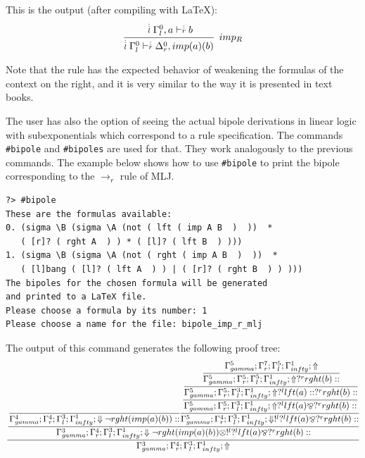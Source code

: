 \documentclass{llncs}
\newcommand{\ndots}[1]{\stackrel{\vcenter{\hbox{$\scriptstyle :$}\vskip-.35ex}}
   {\hbox {$ \scriptstyle {#1}$}}}
\begin{document}
This is the output (after compiling with \LaTeX):
%
{\small
\[
\cfrac{ \ndots{l} \Gamma_{l}^{0}, a \vdash  \ndots{r} b}
{ \ndots{l} \Gamma_{l}^{0} \vdash  \ndots{r} \Delta_{r}^{0}, imp (a) (b) } \;\; imp_{R}
\]
}

Note that the rule has the expected behavior of weakening the formulas of the
context on the right, and it is very similar to the way it is presented in text
books.

The user has also the option of seeing the actual bipole derivations in linear
logic with subexponentials which correspond to a rule specification. The
commands \texttt{\#bipole} and \texttt{\#bipoles} are used for that. They work
analogously to the previous commands. The example below shows how to use
\texttt{\#bipole} to print the bipole corresponding to the $\rightarrow_r$ rule
of MLJ.
\vspace{-1mm}

{\small
\begin{verbatim}
?> #bipole 
These are the formulas available: 
0. (sigma \B (sigma \A (not ( lft ( imp A B  )  ))  * 
   ( [r]? ( rght A  ) ) * ( [l]? ( lft B  ) )))
1. (sigma \B (sigma \A (not ( rght ( imp A B  )  ))  * 
   ( [l]bang ( [l]? ( lft A  ) ) | ( [r]? ( rght B  ) ) )))
The bipoles for the chosen formula will be generated
and printed to a LaTeX file.
Please choose a formula by its number: 1
Please choose a name for the file: bipole_imp_r_mlj
\end{verbatim}
}

The output of this command generates the following proof tree:
%
{\scriptsize\[\cfrac{\cfrac{\cfrac{}
{\Gamma_{ gamma}^{4} ; \Gamma_{r}^{4} ; \Gamma_{l}^{3} ; \Gamma_{ infty}^{1} ;  \Downarrow \neg rght (imp (a) (b) )  :: }\cfrac{\cfrac{\cfrac{\cfrac{\Gamma_{ gamma}^{5} ; \Gamma_{r}^{7} ; \Gamma_{l}^{5} ; \Gamma_{ infty}^{1} ;  \Uparrow }
{\Gamma_{ gamma}^{5} ; \Gamma_{r}^{5} ; \Gamma_{l}^{5} ; \Gamma_{ infty}^{1} ;  \Uparrow  ?^{r} rght (b)  :: }}
{\Gamma_{ gamma}^{5} ; \Gamma_{r}^{5} ; \Gamma_{l}^{3} ; \Gamma_{ infty}^{1} ;  \Uparrow  ?^{l} lft (a)  ::  ?^{r} rght (b)  :: }}
{\Gamma_{ gamma}^{5} ; \Gamma_{r}^{5} ; \Gamma_{l}^{3} ; \Gamma_{ infty}^{1} ;  \Uparrow  ?^{l} lft (a)  \bindnasrepma  ?^{r} rght (b)  :: }}
{\Gamma_{ gamma}^{5} ; \Gamma_{r}^{4} ; \Gamma_{l}^{3} ; \Gamma_{ infty}^{1} ;  \Downarrow  !^{l}  ?^{l} lft (a)  \bindnasrepma  ?^{r} rght (b)  :: }}
{\Gamma_{ gamma}^{3} ; \Gamma_{r}^{4} ; \Gamma_{l}^{3} ; \Gamma_{ infty}^{1} ;  \Downarrow \neg rght (imp (a) (b) )  \otimes  !^{l}  ?^{l} lft (a)  \bindnasrepma  ?^{r} rght (b)  :: }}
{\Gamma_{ gamma}^{3} ; \Gamma_{r}^{4} ; \Gamma_{l}^{3} ; \Gamma_{ infty}^{1} ; \Uparrow }\]}
\end{document}
